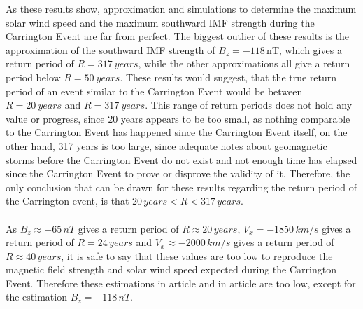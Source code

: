 \documentclass[12pt]{article}
\begin{document}
        As these results show, approximation and simulations to determine the maximum solar wind speed and the maximum southward IMF strength during the Carrington Event are far from perfect. The biggest outlier of these results is the approximation of the southward IMF strength of $B_z=-118\,$nT, which gives a return period of $R=317\ years$, while the other approximations all give a return period below $R=50\ years$. These results would suggest, that the true return period of an event similar to the Carrington Event would be between $R=20\ years$ and $R=317\ years$. This range of return periods does not hold any value or progress, since 20 years appears to be too small, as nothing comparable to the Carrington Event has happened since the Carrington Event itself, on the other hand, 317 years is too large, since adequate notes about geomagnetic storms before the Carrington Event do not exist and not enough time has elapsed since the Carrington Event to prove or disprove the validity of it. Therefore, the only conclusion that can be drawn for these results regarding the return period of the Carrington event, is that $20\, years < R < 317\, years$.\\ \\
        As $B_z\approx -65\, nT$ gives a return period of $R\approx20\, years$, $V_x=-1850\, km/s$ gives a return period of $R=24\, years$ and $V_x\approx -2000\, km/s$ gives a return period of $R\approx 40\, years$, it is safe to say that these values are too low to reproduce the magnetic field strength and solar wind speed expected during the Carrington Event. Therefore these estimations in article\cite{2013cliver} and in article\cite{2021blake} are too low, except for the estimation $B_z=-118\, nT$.
\end{document}
